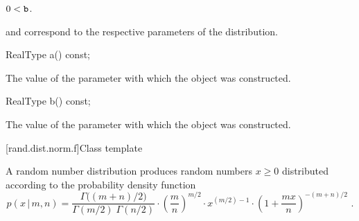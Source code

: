 \begin{itemdescr}
\pnum
\expects
$0 < \texttt{\protect b}$.

\pnum
\remarks
{} and 
correspond to the respective parameters of the distribution.
\end{itemdescr}

%
\begin{itemdecl}
RealType a() const;
\end{itemdecl}

\begin{itemdescr}
\pnum
\returns
The value of the  parameter
 with which the object was constructed.
\end{itemdescr}

%
\begin{itemdecl}
RealType b() const;
\end{itemdecl}

\begin{itemdescr}
\pnum
\returns
The value of the  parameter
 with which the object was constructed.
\end{itemdescr}


[rand.dist.norm.f]{Class template }%
%

\pnum
A  random number distribution
produces random numbers $x \ge 0$
distributed according to
the probability density function%
\[ p(x\,|\,m,n) = \frac{\Gamma\big((m+n)/2\big)}{\Gamma(m/2) \; \Gamma(n/2)}
     \cdot \left(\frac{m}{n}\right)^{m/2}
     \cdot x^{(m/2)-1}
     \cdot \left(1 + \frac{m x}{n}\right)^{-(m + n)/2}
     \text{ .} \]


